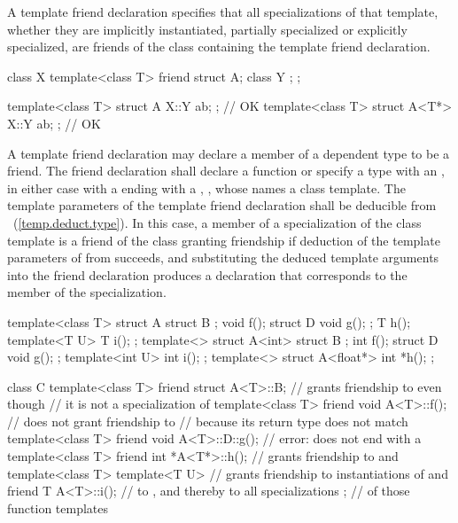 \pnum
A template friend declaration specifies that all specializations of that
template, whether they are implicitly instantiated, partially
specialized or explicitly specialized,
are friends of the class containing the template friend declaration.
\begin{example}
\begin{codeblock}
class X {
  template<class T> friend struct A;
  class Y { };
};

template<class T> struct A { X::Y ab; };            // OK
template<class T> struct A<T*> { X::Y ab; };        // OK
\end{codeblock}
\end{example}

\pnum
A template friend declaration may declare
a member of a dependent type to be a friend.
The friend declaration shall declare a function or
specify a type with an ,
in either case with a 
ending with a , ,
whose  names a class template.
The template parameters of the template friend declaration
shall be deducible from ~(\ref{temp.deduct.type}).
In this case,
a member of a specialization  of the class template
is a friend of the class granting friendship
if deduction of the template parameters
of  from  succeeds, and
substituting the deduced template arguments into the friend declaration
produces a declaration that corresponds to
the member of the specialization.
\begin{example}
\begin{codeblock}
template<class T> struct A {
  struct B { };
  void f();
  struct D {
    void g();
  };
  T h();
  template<T U> T i();
};
template<> struct A<int> {
  struct B { };
  int f();
  struct D {
    void g();
  };
  template<int U> int i();
};
template<> struct A<float*> {
  int *h();
};

class C {
  template<class T> friend struct A<T>::B;      // grants friendship to  even though
                                                // it is not a specialization of 
  template<class T> friend void A<T>::f();      // does not grant friendship to 
                                                // because its return type does not match
  template<class T> friend void A<T>::D::g();   // error:  does not end with a 
  template<class T> friend int *A<T*>::h();     // grants friendship to  and 
  template<class T> template<T U>               // grants friendship to instantiations of  and
    friend T A<T>::i();                         // to , and thereby to all specializations
};                                              // of those function templates
\end{codeblock}
\end{example}

